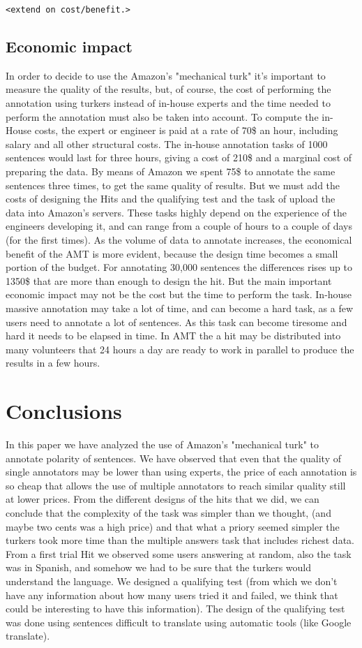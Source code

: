 \documentclass[11pt,letterpaper]{article}
\begin{document}
\texttt{<extend on cost/benefit.>}

\subsection{Economic impact}
In order to decide to use the Amazon's "mechanical turk" it's important to measure the quality of the results, but, of course, the cost of performing the annotation using turkers instead of in-house experts and the time needed to perform the annotation must also be taken into account.
To compute the in-House costs, the expert or engineer is paid at a rate of 70\$ an hour, including salary and all other structural costs. The in-house annotation tasks of 1000 sentences would last for three hours, giving a cost of 210\$ and a marginal cost of preparing the data. By means of Amazon we spent 75\$ to annotate the same sentences three times, to get the same quality of results. But we must add the costs of designing the Hits and  the qualifying test and the task of upload the data into Amazon's servers. These tasks highly depend on the experience of the engineers developing it, and can range from a couple of hours to a couple of days (for the first times).
As the volume of data to annotate increases, the economical benefit of the AMT is more evident, because the design time becomes a small portion of the budget. For annotating 30,000 sentences the differences rises up to 1350\$ that are more than enough to design the hit. 
But the main important economic impact may not be the cost but the time to perform the task. In-house massive annotation may take a lot of time, and can become a hard task, as a few users need to annotate a lot of sentences. As this task can become tiresome and hard it needs to be elapsed in time. In AMT the a hit may be distributed into many volunteers that 24 hours a day are ready to work in parallel to produce the results in a few hours.     
\section{Conclusions}
In this paper we have analyzed the use of Amazon's "mechanical turk" to annotate polarity of sentences. We have observed that even that the quality of single annotators may be lower than using experts, the price of each annotation is so cheap that allows the use of multiple annotators to reach similar quality still at lower prices. 
From the different designs of the hits that we did, we can conclude that the complexity of the task was simpler than we thought, (and maybe two cents was a high price) and that what a priory seemed simpler the turkers took more time than the multiple answers task that includes richest data. From a first trial Hit we observed some users answering at random, also the task was in Spanish, and somehow we had to be sure that the turkers would understand the language. We designed a qualifying test (from which we don't have any information about how many users tried it and failed, we think that could be interesting to have this information). The design of the qualifying test was done using sentences difficult to translate using automatic tools (like Google translate).
\end{document}
